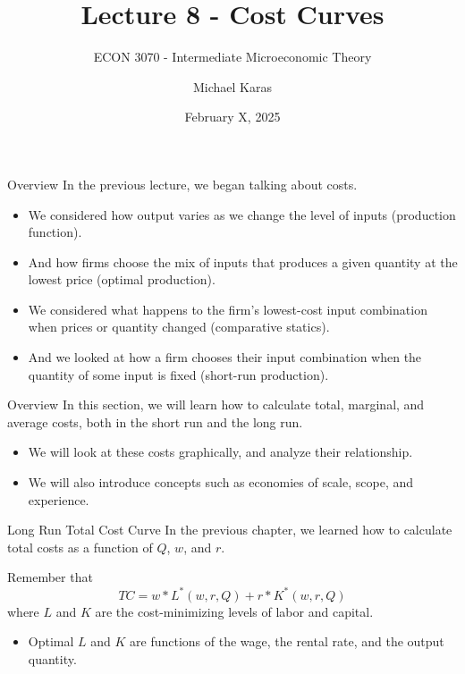 \documentclass[11pt,t]{beamer}
\author{Michael Karas}
\title{Lecture 8 - Cost Curves}
\subtitle{ECON 3070 - Intermediate Microeconomic Theory}
\date{February X, 2025}
\begin{document}
\begin{frame}
  \titlepage
\end{frame}

\begin{frame}{Overview}
  In the previous lecture, we began talking about costs.

  \begin{itemize}
    \item We considered how output varies as we change the level of inputs (production function).
    
    \item And how firms choose the mix of inputs that produces a given quantity at the lowest price (optimal production).
    
    \item We considered what happens to the firm's lowest-cost input combination when prices or quantity changed (comparative statics).
    
    \item And we looked at how a firm chooses their input combination when the quantity of some input is fixed (short-run production).
  \end{itemize}
\end{frame}

\begin{frame}{Overview}
  In this section, we will learn how to calculate total, marginal, and average costs, both in the short run and the long run.

  \begin{itemize}
    \item We will look at these costs graphically, and analyze their relationship.
    \item We will also introduce concepts such as economies of scale, scope, and experience.
  \end{itemize}

\end{frame}

\begin{frame}{Long Run Total Cost Curve}
  In the previous chapter, we learned how to calculate total costs as a function of $Q$, $w$, and $r$.
  
  \bigskip\pause
  Remember that 
  $$
  TC = w*L^*(w,r,Q)+r*K^*(w,r,Q)
  $$
  where $L$ and $K$ are the cost-minimizing levels of labor and capital.

  \begin{itemize}
    \item Optimal $L$ and $K$ are functions of the wage, the rental rate, and the output quantity.
  \end{itemize}
  
\end{frame}
\end{document}
